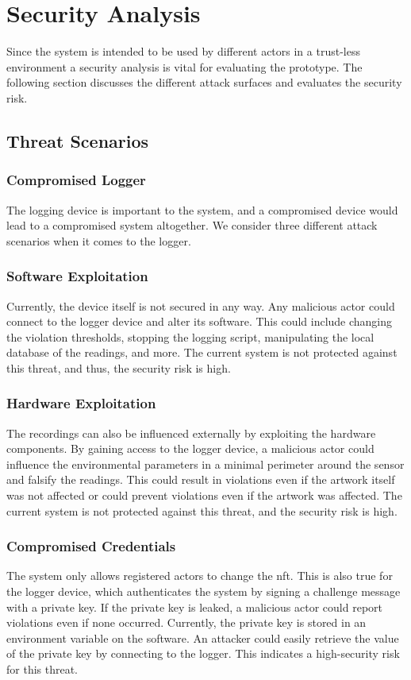 \section{Security Analysis}
\label{sec:security_analysis}
Since the system is intended to be used by different actors in a trust-less environment a security analysis is vital for evaluating the prototype. The following section discusses the different attack surfaces and evaluates the security risk.

\subsection{Threat Scenarios}
\subsubsection{Compromised Logger}
The logging device is important to the system, and a compromised device would lead to a compromised system altogether. We consider three different attack scenarios when it comes to the logger.
\subsubsection{Software Exploitation}
Currently, the device itself is not secured in any way. Any malicious actor could connect to the logger device and alter its software. This could include changing the violation thresholds, stopping the logging script, manipulating the local database of the readings, and more. The current system is not protected against this threat, and thus, the security risk is high.
\subsubsection{Hardware Exploitation}
The recordings can also be influenced externally by exploiting the hardware components. By gaining access to the logger device, a malicious actor could influence the environmental parameters in a minimal perimeter around the sensor and falsify the readings. This could result in violations even if the artwork itself was not affected or could prevent violations even if the artwork was affected. The current system is not protected against this threat, and the security risk is high.
\subsubsection{Compromised Credentials}
The system only allows registered actors to change the \gls{nft}. This is also true for the logger device, which authenticates the system by signing a challenge message with a private key. If the private key is leaked, a malicious actor could report violations even if none occurred. Currently, the private key is stored in an environment variable on the software. An attacker could easily retrieve the value of the private key by connecting to the logger. This indicates a high-security risk for this threat.

